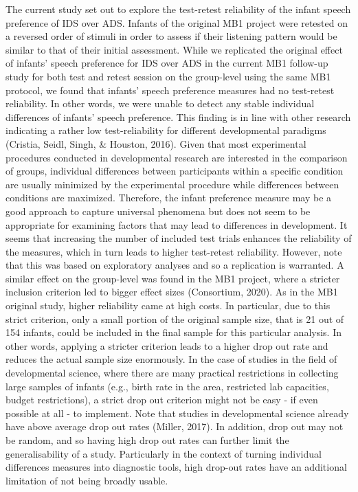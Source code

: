 \documentclass[
  english,
  man,floatsintext]{apa6}
\begin{document}
The current study set out to explore the test-retest reliability of the infant speech preference of IDS over ADS. Infants of the original MB1 project were retested on a reversed order of stimuli in order to assess if their listening pattern would be similar to that of their initial assessment. While we replicated the original effect of infants' speech preference for IDS over ADS in the current MB1 follow-up study for both test and retest session on the group-level using the same MB1 protocol, we found that infants' speech preference measures had no test-retest reliability. In other words, we were unable to detect any stable individual differences of infants' speech preference. This finding is in line with other research indicating a rather low test-reliability for different developmental paradigms (Cristia, Seidl, Singh, \& Houston, 2016). Given that most experimental procedures conducted in developmental research are interested in the comparison of groups, individual differences between participants within a specific condition are usually minimized by the experimental procedure while differences between conditions are maximized. Therefore, the infant preference measure may be a good approach to capture universal phenomena but does not seem to be appropriate for examining factors that may lead to differences in development.
It seems that increasing the number of included test trials enhances the reliability of the measures, which in turn leads to higher test-retest reliability. However, note that this was based on exploratory analyses and so a replication is warranted. A similar effect on the group-level was found in the MB1 project, where a stricter inclusion criterion led to bigger effect sizes (Consortium, 2020). As in the MB1 original study, higher reliability came at high costs. In particular, due to this strict criterion, only a small portion of the original sample size, that is 21 out of 154 infants, could be included in the final sample for this particular analysis. In other words, applying a stricter criterion leads to a higher drop out rate and reduces the actual sample size enormously. In the case of studies in the field of developmental science, where there are many practical restrictions in collecting large samples of infants (e.g., birth rate in the area, restricted lab capacities, budget restrictions), a strict drop out criterion might not be easy - if even possible at all - to implement. Note that studies in developmental science already have above average drop out rates (Miller, 2017). In addition, drop out may not be random, and so having high drop out rates can further limit the generalisability of a study. Particularly in the context of turning individual differences measures into diagnostic tools, high drop-out rates have an additional limitation of not being broadly usable.
\end{document}
